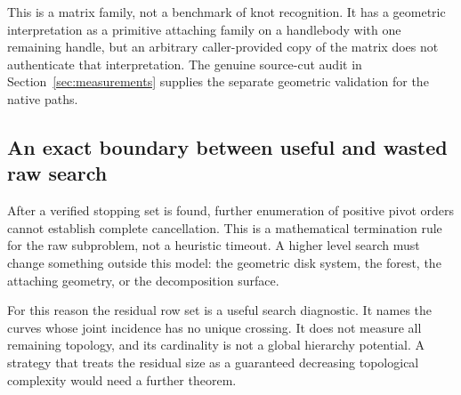 This is a matrix family, not a benchmark of knot recognition. It has a
geometric interpretation as a primitive attaching family on a handlebody
with one remaining handle, but an arbitrary caller-provided copy of the
matrix does not authenticate that interpretation. The genuine source-cut
audit in Section~\ref{sec:measurements} supplies the separate geometric
validation for the native paths.

\subsection{An exact boundary between useful and wasted raw search}

After a verified stopping set is found, further enumeration of positive
pivot orders cannot establish complete cancellation. This is a mathematical
termination rule for the raw subproblem, not a heuristic timeout. A higher
level search must change something outside this model: the geometric disk
system, the forest, the attaching geometry, or the decomposition surface.

For this reason the residual row set is a useful search diagnostic. It names
the curves whose joint incidence has no unique crossing. It does not measure
all remaining topology, and its cardinality is not a global hierarchy
potential. A strategy that treats the residual size as a guaranteed decreasing
topological complexity would need a further theorem.
